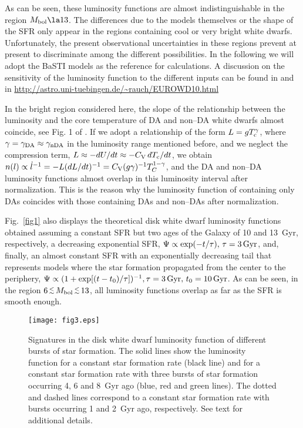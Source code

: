 \documentclass[useAMS,usenatbib]{mnras}
\newcommand{\lppr}{\stackrel{<}{\scriptstyle \sim}}
\newcommand{\lappr}{\raisebox{-0.4ex}{$\lppr$}}
\begin{document}
 As can be seen, these luminosity functions are almost indistinguishable in the region $M_{\rm bol} \la 13$. The differences due to the models themselves or the
shape of  the SFR only appear  in the regions containing  cool or very
bright  white   dwarfs.   Unfortunately,  the   present  observational
uncertainties in these regions prevent at present to discriminate among the different possibilities. In the following we will 
adopt the BaSTI models as the reference for calculations. A 
discussion on the sensitivity of the luminosity function to the different inputs 
can be found in \citet{iser09} and in \url{http://astro.uni-tuebingen.de/~rauch/EUROWD10.html} 

In the bright region considered here, the slope of the relationship between the luminosity and the core temperature of DA and non--DA white dwarfs almost coincide, see Fig. 1 of \citet{sala10}. If we adopt a relationship of the form $L = gT_{\rm c}^\gamma$, where  $\gamma = \gamma _{\rm DA} \approx \gamma _{\rm nDA}$ in the luminosity range mentioned before, and we neglect the compression term,
$L \approx  - dU/dt \approx  - C_{\rm V}\,dT_{\rm c}/dt$,
we obtain 
$n(l) \propto {\dot l}^{ - 1} =  - L(dL/dt)^{-1} = C_{\rm V}(g\gamma)^{-1}T_C^{1 - \gamma }$, and the DA and non--DA luminosity functions almost overlap in this luminosity interval after normalization. This is the reason why the luminosity function of \citet{dege08} containing only DAs coincides with those containing DAs and non--DAs after normalization.


Fig.~\ref{fig1} also displays  the theoretical disk white  dwarf luminosity 
functions obtained assuming  a  constant SFR but two ages of  the Galaxy of 10 and 13~Gyr, 
respectively, a decreasing exponential SFR, $\Psi \propto \exp (-t/\tau),\, \tau= 3\,{\rm Gyr} $, 
and, finally, an almost constant SFR with an exponentially decreasing tail that represents models 
where the star formation propagated from the center to the periphery,
 $\Psi \propto (1+\exp [(t-t_0)/\tau])^{-1}, \tau = 3 \, {\rm Gyr},\, t_0= 10\,{\rm Gyr}$. 
As can be seen, in the region $6 \, \lappr\, M_{\rm bol}\, \lappr \, 13$, all luminosity 
functions overlap as far as the SFR is smooth enough.


\begin{figure}
\centering
\texttt{[image: fig3.eps]}
\caption{Signatures  in the  disk white  dwarf luminosity  function of
  different  bursts  of  star  formation.  The  solid  lines  show  the
  luminosity function for a constant  star formation rate (black line)
  and for  a constant star  formation rate  with three bursts  of star
  formation occurring 4, 6 and 8~Gyr  ago (blue, red and green lines).
  The dotted and dashed lines  correspond to a constant star formation
  rate with bursts occurring 1  and 2~Gyr ago, respectively.  See text
  for additional details.}
\label{fig3}
\end{figure}
\end{document}
